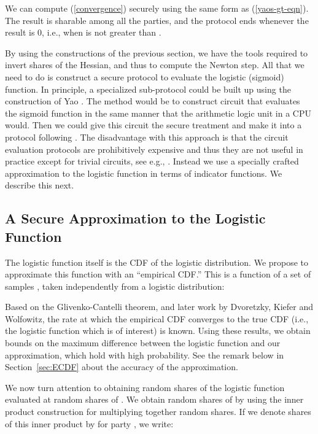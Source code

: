 \documentclass[11pt]{article}
\begin{document}
We can compute (\ref{convergence}) securely using the same form as (\ref{yaos-gt-eqn}).  The result is sharable among all the parties, and the protocol ends whenever the result is 0, i.e., when  is not greater than .



By using the constructions of the previous section, we have the tools required to invert shares of the Hessian, and thus to compute the Newton step.  All that we need to do is  construct a secure protocol to evaluate the logistic (sigmoid) function.  In principle, a specialized sub-protocol could be built up using the construction of Yao \cite{yao82}.  The method would be to construct circuit that evaluates the sigmoid function in the same manner that the arithmetic logic unit in a CPU would.  Then we could give this circuit the secure treatment and make it into a protocol following \citet{goldreich}.  The disadvantage with this approach is that the circuit evaluation protocols are prohibitively expensive and thus they are not  useful in practice except for trivial circuits, see e.g.,  \citet{fairplay}.   Instead we use a specially crafted approximation to the logistic function in terms of indicator functions.  We describe this next.

\subsection{A Secure Approximation to the Logistic Function}\label{sec:RS_of_sigma}

The logistic function itself is the CDF of the logistic distribution.  We propose to approximate this function with an ``empirical CDF.''  This is a function of a set of  samples , taken independently from a logistic distribution:



Based on the Glivenko-Cantelli theorem, and later work by Dvoretzky, Kiefer and Wolfowitz, the rate at which the empirical CDF converges to the true CDF (i.e., the logistic function which is of interest) is known.  Using these results, we  obtain bounds on the maximum difference between the logistic function and our approximation, which hold with high probability.  See the remark below in Section~\ref{sec:ECDF} about the accuracy of the approximation.

We now turn attention to obtaining random shares of the logistic function evaluated at random shares of .  We obtain random shares of  by using the inner product construction for multiplying together random shares.  If we denote shares of this inner product by  for party , we  write:
\end{document}

